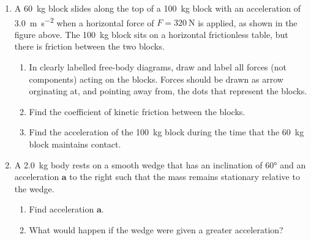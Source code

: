 \begin{enumerate}[itemsep=6pt]
\item A \SI{60}{\kilo\gram} block slides along the top of a
  \SI{100}{\kilo\gram} block with an acceleration of
  \SI{3.0}{\metre\per\second\squared} when a horizontal force of
  $F=\SI{320}\newton$ is applied, as shown in the figure above. The 
  \SI{100}{\kilo\gram} block sits on a horizontal frictionless table, but there
  is friction between the two blocks.
  \begin{enumerate}
  \item In clearly labelled free-body diagrams, draw and label all forces (not
    components) acting on the blocks. Forces should be drawn as arrow
    orginating at, and pointing away from, the dots that represent the blocks.

  \item Find the coefficient of kinetic friction between the blocks.
    
  \item Find the acceleration of the \SI{100}{\kilo\gram} block during the
    time that the \SI{60}{\kilo\gram} block maintains contact.
  \end{enumerate}
  \begin{center}
  \end{center}

\item A \SI{2.0}{\kilo\gram} body rests on a smooth wedge that has an
  inclination of \ang{60} and an acceleration $\bm a$ to the right such that
  the mass remains stationary relative to the wedge.
  \begin{enumerate}
  \item Find acceleration $\bm a$.
  \item What would happen if the wedge were given a greater acceleration?
  \end{enumerate}
  

\end{enumerate}
